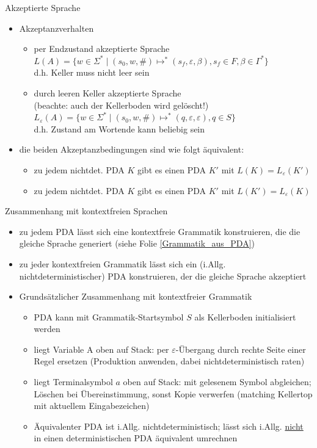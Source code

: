 \begin{frame}{Akzeptierte Sprache}
	\begin{itemize}
		\item Akzeptanzverhalten
		\begin{itemize}
			\item per Endzustand akzeptierte Sprache\\
			$L(A)=\{w \in \Sigma^* \mid (s_0, w, \#) \mapsto^* (s_f, \varepsilon, \beta), s_f \in F, \beta \in \Gamma^*\}$\\
			d.h. Keller muss nicht leer sein
			\item durch leeren Keller akzeptierte Sprache\\
			(beachte: auch der Kellerboden wird gelöscht!)\\
			$L_\varepsilon(A)=\{w \in \Sigma^*\mid (s_0, w, \#) \mapsto^* (q, \varepsilon, \varepsilon), q \in S\}$\\
			d.h. Zustand am Wortende kann beliebig sein
		\end{itemize}
		\item die beiden Akzeptanzbedingungen sind wie folgt äquivalent:
		\begin{itemize}
			\item zu jedem nichtdet. PDA $K$ gibt es einen PDA $K'$ mit $L(K) = L_\varepsilon(K')$
			\item zu jedem nichtdet. PDA $K$ gibt es einen PDA $K'$ mit $L(K') = L_\varepsilon(K)$
		\end{itemize}
	\end{itemize}
\end{frame}

\begin{frame}{Zusammenhang mit kontextfreien Sprachen}
	\begin{itemize}
		\item zu jedem PDA lässt sich eine kontextfreie Grammatik konstruieren, die die gleiche Sprache generiert (siehe Folie \ref{Grammatik_aus_PDA})
		\item zu jeder kontextfreien Grammatik lässt sich ein (i.Allg. nichtdeterministischer) PDA konstruieren, der die gleiche Sprache akzeptiert
		\item Grundsätzlicher Zusammenhang mit kontextfreier Grammatik
		\begin{itemize}
			\item PDA kann mit Grammatik-Startsymbol $S$ als Kellerboden initialisiert werden
			\item liegt Variable A oben auf Stack: per $\varepsilon$-Übergang durch rechte Seite einer Regel ersetzen (Produktion anwenden, dabei nichtdeterministisch raten)
			\item liegt Terminalsymbol $a$ oben auf Stack: mit gelesenem Symbol abgleichen; Löschen bei Übereinstimmung, sonst Kopie verwerfen (matching Kellertop mit aktuellem Eingabezeichen)
			\item Äquivalenter PDA ist i.Allg. nichtdeterministisch; lässt sich i.Allg. \underline{nicht} in einen deterministischen PDA äquivalent umrechnen
		\end{itemize}
	\end{itemize}
\end{frame}

